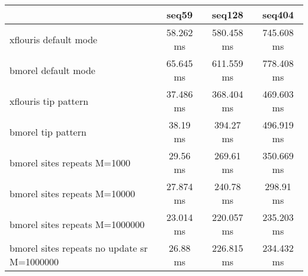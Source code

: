 \begin{tabular}{|l|c|c|c|}
\hline
 & seq59 & seq128 & seq404  \\
\hline
xflouris default mode & 58.262 ms & 580.458 ms & 745.608 ms\\
\hline
bmorel default mode & 65.645 ms & 611.559 ms & 778.408 ms\\
\hline
xflouris tip pattern & 37.486 ms & 368.404 ms & 469.603 ms\\
\hline
bmorel tip pattern & 38.19 ms & 394.27 ms & 496.919 ms\\
\hline
bmorel sites repeats M=1000 & 29.56 ms & 269.61 ms & 350.669 ms\\
\hline
bmorel sites repeats M=10000 & 27.874 ms & 240.78 ms & 298.91 ms\\
\hline
bmorel sites repeats M=1000000 & 23.014 ms & 220.057 ms & 235.203 ms\\
\hline
bmorel sites repeats no update sr  M=1000000 & 26.88 ms & 226.815 ms & 234.432 ms\\
\hline
\end{tabular}
